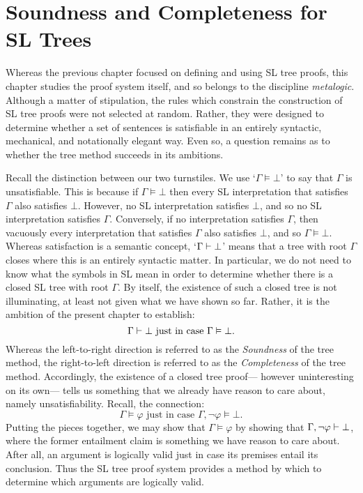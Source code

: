 \chapter{Soundness and Completeness for SL Trees}
\label{ch.SLsoundcomplete}

Whereas the previous chapter focused on defining and using SL tree proofs, this chapter studies the proof system itself, and so belongs to the discipline \emph{metalogic}.
Although a matter of stipulation, the rules which constrain the construction of SL tree proofs were not selected at random.
Rather, they were designed to determine whether a set of sentences is satisfiable in an entirely syntactic, mechanical, and notationally elegant way.
Even so, a question remains as to whether the tree method succeeds in its ambitions.

Recall the distinction between our two turnstiles.
We use `$\Gamma \models \bot$' to say that $\Gamma$ is unsatisfiable.
This is because if $\Gamma \models \bot$ then every SL interpretation that satisfies $\Gamma$ also satisfies $\bot$.
However, no SL interpretation satisfies $\bot$, and so no SL interpretation satisfies $\Gamma$.
Conversely, if no interpretation satisfies $\Gamma$, then vacuously every interpretation that satisfies $\Gamma$ also satisfies $\bot$, and so $\Gamma \models \bot$.
Whereas satisfaction is a semantic concept, `$\Gamma \vdash \bot$' means that a tree with root $\Gamma$ closes where this is an entirely syntactic matter.
In particular, we do not need to know what the symbols in SL mean in order to determine whether there is a closed SL tree with root $\Gamma$.
By itself, the existence of such a closed tree is not illuminating, at least not given what we have shown so far.
Rather, it is the ambition of the present chapter to establish:
  $$\Gamma \vdash \bot \text{ just in case } \Gamma \vDash \bot.$$
Whereas the left-to-right direction is referred to as the \textit{Soundness} of the tree method, the right-to-left direction is referred to as the \textit{Completeness} of the tree method.
Accordingly, the existence of a closed tree proof--- however uninteresting on its own--- tells us something that we already have reason to care about, namely unsatisfiability.
Recall, the connection: %
    $$\Gamma \models \varphi \text{ just in case } \Gamma, \neg \varphi \models \bot.$$
Putting the pieces together, we may show that $\Gamma \models \varphi$ by showing that $\Gamma, \neg \varphi \vdash \bot$, where the former entailment claim is something we have reason to care about.
After all, an argument is logically valid just in case its premises entail its conclusion.
Thus the SL tree proof system provides a method by which to determine which arguments are logically valid.





